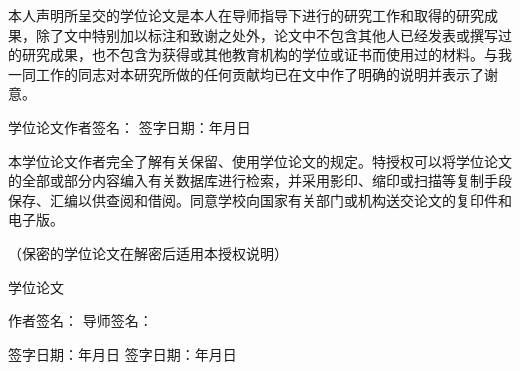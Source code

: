 
\clearpage{\cleardoublepage} %
\thispagestyle{empty} %
\setlength{\baselineskip}{20pt} %

\vspace*{1cm}

\begin{center}\end{center}

\vspace{0.5cm}

本人声明所呈交的学位论文是本人在导师指导下进行的研究工作和取得的研究成果，除了文中特别加以标注和致谢之处外，论文中不包含其他人已经发表或撰写过的研究成果，也不包含为获得{\underline{\textbf{}}}或其他教育机构的学位或证书而使用过的材料。与我一同工作的同志对本研究所做的任何贡献均已在文中作了明确的说明并表示了谢意。

\vspace{1.5cm} 

\noindent 学位论文作者签名：\makebox[4cm][s]{} 签字日期：\makebox[1.5cm][s]{}年\makebox[1cm][s]{}月\makebox[1cm][s]{}日

\vspace{2.5cm} 

\begin{center}\end{center}

\vspace{1cm} 

本学位论文作者完全了解{\underline{}}有关保留、使用学位论文的规定。特授权{\underline{}}可以将学位论文的全部或部分内容编入有关数据库进行检索，并采用影印、缩印或扫描等复制手段保存、汇编以供查阅和借阅。同意学校向国家有关部门或机构送交论文的复印件和电子版。

\hspace{2em}（保密的学位论文在解密后适用本授权说明）

\vspace{2.2cm} 

\noindent 学位论文

\noindent 作者签名：\makebox[4cm][s]{} 导师签名：\makebox[4cm][s]{}

\vspace{0.8cm} 

\noindent 签字日期：\makebox[1.5cm][s]{}年\makebox[1cm][s]{}月\makebox[1cm][s]{}日 
\qquad 签字日期：\makebox[1.5cm][s]{}年\makebox[1cm][s]{}月\makebox[1cm][s]{}日
